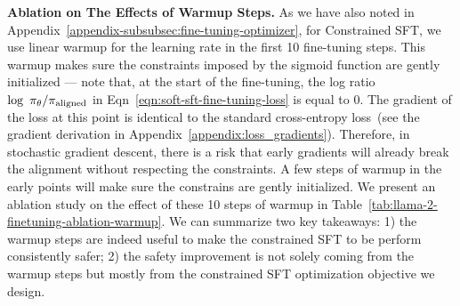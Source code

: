 \textbf{Ablation on The Effects of Warmup Steps.} As we have also noted in Appendix~\ref{appendix-subsubsec:fine-tuning-optimizer}, for Constrained SFT, we use linear warmup for the learning rate in the first 10 fine-tuning steps. This warmup makes sure the constraints imposed by the sigmoid function are gently initialized --- note that, at the start of the fine-tuning, the log ratio $\log~\pi_{\theta} / \pi_{\mathrm{aligned}}$ in Eqn~\ref{eqn:soft-sft-fine-tuning-loss} is equal to 0. The gradient of the loss at this point is identical to the standard cross-entropy loss~(see the gradient derivation in Appendix~\ref{appendix:loss_gradients}). Therefore, in stochastic gradient descent, there is a risk that early gradients will already break the alignment without respecting the constraints. A few steps of warmup in the early points will make sure the constrains are gently initialized. We present an ablation study on the effect of these 10 steps of warmup in Table~\ref{tab:llama-2-finetuning-ablation-warmup}. We can summarize two key takeaways: 1) the warmup steps are indeed useful to make the constrained SFT to be perform consistently safer; 2) the safety improvement is not solely coming from the warmup steps but mostly from the constrained SFT optimization objective we design. 


